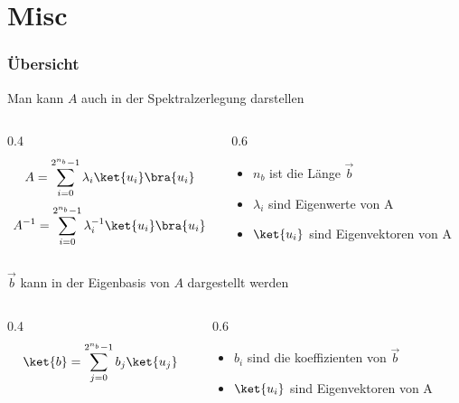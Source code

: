 \section{Misc}
\begin{frame}
    \frametitle{Übersicht}

        \hfil

        Man kann $A$ auch in der Spektralzerlegung darstellen

        \begin{columns}[c]
            \begin{column}{0.4\hsize}\centering
            $$A = \sum_{i=0}^{2^{n_b}-1} \lambda_i \ket{u_i}\bra{u_i}$$
            $$A^{-1} = \sum_{i=0}^{2^{n_b}-1} \lambda_i^{-1} \ket{u_i}\bra{u_i}$$
            \end{column}

            \begin{column}{0.6\hsize}
            \begin{itemize}
            \item   $n_b$ ist die Länge $\vec{b}$ 
            \item   $\lambda_i$ sind Eigenwerte von A
            \item   $\ket{u_i}$ sind Eigenvektoren von A
            \end{itemize}
 
            \end{column}
        \end{columns}

        \hfil

        \hfil

        $\vec{b}$ kann in der Eigenbasis von $A$ dargestellt werden 

        \begin{columns}[c]
            \begin{column}{0.4\hsize}\centering
            $$\ket{b} = \sum_{j=0}^{2^{n_b}-1} b_j\ket{u_j}$$
            \end{column}
            \begin{column}{0.6\hsize}
            \begin{itemize}
            \item   $b_i$ sind die koeffizienten von $\vec{b}$
            \item   $\ket{u_i}$ sind Eigenvektoren von A
            \end{itemize}
 
            \end{column}
        \end{columns}



\end{frame}


